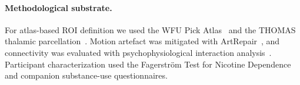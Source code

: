 \paragraph{Methodological substrate.} For atlas-based ROI definition we used the WFU Pick Atlas~\cite{maldjian2003automated} and the THOMAS thalamic parcellation~\cite{mcleod2017spatially}. Motion artefact was mitigated with ArtRepair~\cite{mazaika2009artifact}, and connectivity was evaluated with psychophysiological interaction analysis~\cite{friston1997psychophysiological}. Participant characterization used the Fagerstr\"{o}m Test for Nicotine Dependence~\cite{fagerstrom1991measuring} and companion substance-use questionnaires.

